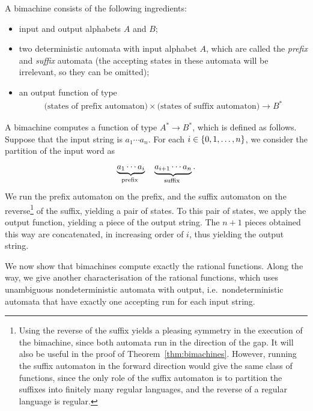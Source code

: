 \begin{definition}
    [Bimachine]
    \label{def:bimachine} A bimachine consists of the following ingredients:
    \begin{itemize}
        \item input and output alphabets $A$ and $B$;
        \item two deterministic automata with input alphabet $A$, which are called the \emph{prefix} and \emph{suffix} automata (the accepting states in these automata will be irrelevant, so they can be omitted);
        \item an output function of type 
        \begin{align*}
        \text{(states of prefix automaton)} 
        \times
        \text{(states of suffix automaton)}
        \to B^*
        \end{align*}
    \end{itemize}
\end{definition}

A bimachine computes a function of type $A^* \to B^*$, which is defined as follows. Suppose that the input string is $a_1 \cdots a_n$. For each $i \in \{0,1,\ldots,n\}$, we consider the partition of the input word as
\begin{align*}
\myunderbrace{a_1 \cdots a_{i}}{prefix}
\quad 
\myunderbrace{a_{i+1} \cdots a_n}{suffix}.
\end{align*}
We run the prefix automaton on the prefix, and the suffix automaton on the reverse\footnote{
    Using the reverse of the suffix yields a pleasing symmetry in the execution of the bimachine, since both automata run in the direction of the gap. It  will also  be useful in the proof of Theorem~\ref{thm:bimachines}. However, running the suffix automaton in the forward direction would give the same class of functions, since the only role of the suffix automaton is to partition the suffixes into finitely many regular languages, and the reverse of a regular language is regular.
} of the  suffix, yielding a pair of states. To this pair of states, we apply the output function, yielding a piece of the output string. The $n+1$ pieces obtained this way are concatenated, in increasing order of $i$, thus  yielding  the output string.

We now show that bimachines compute exactly the rational functions. Along the way, we give another characterisation of the rational functions, which uses unambiguous nondeterministic automata with output, i.e.~nondeterministic automata that have exactly one accepting run for each input string.


